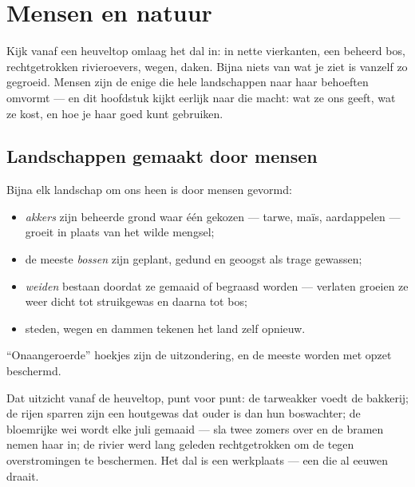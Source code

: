 \chapter{Mensen en natuur}\label{ch:g5:people-and-nature}

Kijk vanaf een heuveltop omlaag het dal in:  in nette vierkanten,
een beheerd bos, rechtgetrokken rivieroevers, wegen, daken. Bijna niets
van wat je ziet is vanzelf zo gegroeid. Mensen zijn de enige  die
hele landschappen naar haar behoeften omvormt --- en dit hoofdstuk kijkt
eerlijk naar die macht: wat ze ons geeft, wat ze kost, en hoe je haar
goed kunt gebruiken.

\section{Landschappen gemaakt door mensen}

\begin{proposition}\label{prop:g5:people-and-nature:managed}
Bijna elk landschap om ons heen is door mensen gevormd:
\begin{itemize}
  \item \emph{akkers} zijn beheerde grond waar één gekozen
         --- tarwe, maïs, aardappelen --- groeit in plaats van het
        wilde mengsel;
  \item de meeste \emph{bossen} zijn geplant,
        gedund en geoogst als trage gewassen;
  \item \emph{weiden} bestaan doordat ze gemaaid of begraasd worden ---
        verlaten groeien ze weer dicht tot struikgewas en daarna tot bos;
  \item steden, wegen en dammen tekenen het land zelf opnieuw.
\end{itemize}
``Onaangeroerde'' hoekjes zijn de uitzondering, en de meeste worden met
opzet beschermd.
\end{proposition}
\admitted

\begin{example}\label{ex:g5:people-and-nature:valley}
Dat uitzicht vanaf de heuveltop, punt voor punt: de tarweakker voedt de
bakkerij; de rijen sparren zijn een houtgewas dat ouder is dan hun
boswachter; de bloemrijke wei wordt elke juli gemaaid --- sla twee
zomers over en de bramen nemen haar in; de rivier werd lang geleden
rechtgetrokken om de  tegen overstromingen te beschermen. Het dal
is een werkplaats --- een die al eeuwen draait.
\end{example}

